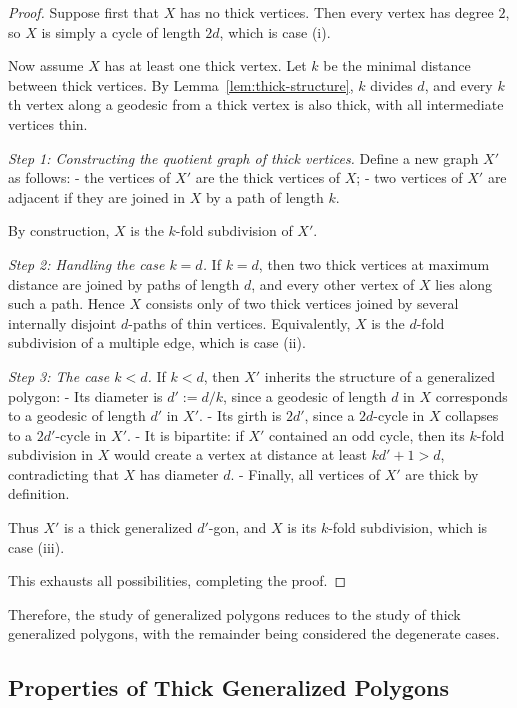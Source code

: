 \documentclass[12pt,a4paper,openany]{book}
\begin{document}
\begin{proof}
Suppose first that $X$ has no thick vertices. Then every vertex has degree $2$, so $X$ is simply a cycle of length $2d$, which is case (i).

\smallskip
Now assume $X$ has at least one thick vertex.  
Let $k$ be the minimal distance between thick vertices. By Lemma~\ref{lem:thick-structure}, $k$ divides $d$, and every $k$th vertex along a geodesic from a thick vertex is also thick, with all intermediate vertices thin.  

\emph{Step 1: Constructing the quotient graph of thick vertices.}  
Define a new graph $X'$ as follows:  
- the vertices of $X'$ are the thick vertices of $X$;  
- two vertices of $X'$ are adjacent if they are joined in $X$ by a path of length $k$.  

By construction, $X$ is the $k$-fold subdivision of $X'$.

\smallskip
\emph{Step 2: Handling the case $k=d$.}  
If $k=d$, then two thick vertices at maximum distance are joined by paths of length $d$, and every other vertex of $X$ lies along such a path. Hence $X$ consists only of two thick vertices joined by several internally disjoint $d$-paths of thin vertices. Equivalently, $X$ is the $d$-fold subdivision of a multiple edge, which is case (ii).

\smallskip
\emph{Step 3: The case $k<d$.}  
If $k<d$, then $X'$ inherits the structure of a generalized polygon:  
- Its diameter is $d' := d/k$, since a geodesic of length $d$ in $X$ corresponds to a geodesic of length $d'$ in $X'$.  
- Its girth is $2d'$, since a $2d$-cycle in $X$ collapses to a $2d'$-cycle in $X'$.  
- It is bipartite: if $X'$ contained an odd cycle, then its $k$-fold subdivision in $X$ would create a vertex at distance at least $kd'+1 > d$, contradicting that $X$ has diameter $d$.  
- Finally, all vertices of $X'$ are thick by definition.  

Thus $X'$ is a thick generalized $d'$-gon, and $X$ is its $k$-fold subdivision, which is case (iii).

\smallskip
This exhausts all possibilities, completing the proof.
\end{proof}

Therefore, the study of generalized polygons reduces to the study of thick generalized polygons, with the remainder being considered the degenerate cases. 

\subsection{Properties of Thick Generalized Polygons}
\end{document}
